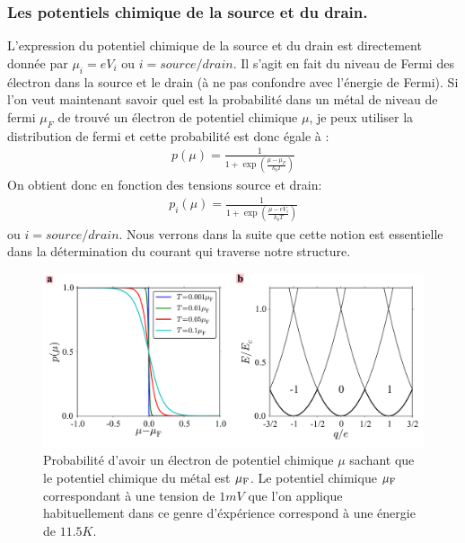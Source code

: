 \subsubsection{Les potentiels chimique de la source et du drain.}
L'expression du potentiel chimique de la source et du drain est directement donnée par $\mu_i = e V_i$ ou $i=source/drain$. Il s'agit en fait du niveau de Fermi des électron dans la source et le drain (à ne pas confondre avec l'énergie de Fermi). Si l'on veut maintenant savoir quel est la probabilité dans un métal de niveau de fermi $\mu_F$ de trouvé un électron de potentiel chimique $\mu$, je peux utiliser la distribution de fermi et cette probabilité est donc égale à :
\begin{eqnarray}
p(\mu) = \frac{1}{1 + \exp{(\frac{\mu - \mu_F}{k_bT})}} \nonumber
\end{eqnarray}
 On obtient donc en fonction des tensions source et drain:
\begin{eqnarray}
p_i(\mu) = \frac{1}{1 + \exp{(\frac{\mu - eV_i}{k_bT})}}
\end{eqnarray}
ou $i=source/drain$. Nous verrons dans la suite que cette notion est essentielle dans la détermination du courant qui traverse notre structure.

\begin{figure}
\centering \includegraphics[scale=0.5]{Theorie/Transport/figure2/figure2.pdf} 
\caption{Probabilité d'avoir un électron de potentiel chimique $\mu$ sachant que le potentiel chimique du métal est $\mu_{\rm{F}}$. Le potentiel chimique $\mu_{\rm{F}}$ correspondant à une tension de $1mV$ que l'on applique habituellement dans ce genre d'éxpérience correspond à une énergie de $11.5K$.}
\label{distrib_fermi}
\end{figure}



